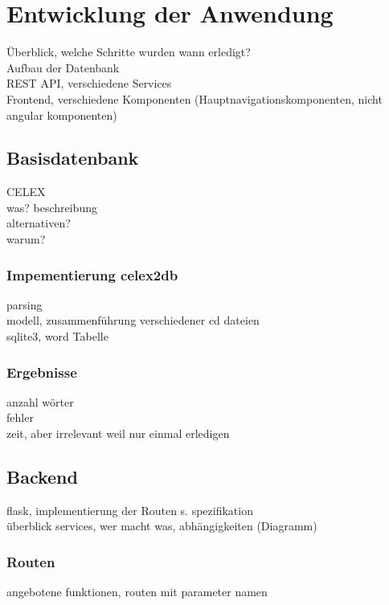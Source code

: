 
\chapter{Entwicklung der Anwendung}

Überblick, welche Schritte wurden wann erledigt?\\
Aufbau der Datenbank\\
REST API, verschiedene Services\\
Frontend, verschiedene Komponenten (Hauptnavigationskomponenten, nicht angular komponenten)\\

\section{Basisdatenbank}

CELEX\\
was? beschreibung\\
alternativen?\\
warum?

\subsection{Impementierung celex2db}

parsing\\
modell, zusammenführung verschiedener cd dateien\\
sqlite3, word Tabelle\\

\subsection{Ergebnisse}

anzahl wörter\\
fehler\\
zeit, aber irrelevant weil nur einmal erledigen


\section{Backend}

flask, implementierung der Routen s. spezifikation\\
überblick services, wer macht was, abhängigkeiten (Diagramm)\\

\subsection{Routen}
angebotene funktionen, routen mit parameter namen

